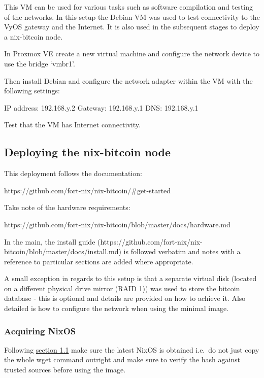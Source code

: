 This VM can be used for various tasks such as software compilation and
testing of the networks. In this setup the Debian VM was used to test
connectivity to the VyOS gateway and the Internet. It is also used in
the subsequent stages to deploy a nix-bitcoin node.

In Proxmox VE create a new virtual machine and configure the network
device to use the bridge `vmbr1'.

Then install Debian and configure the network adapter within the VM with
the following settings:

IP address: 192.168.y.2 Gateway: 192.168.y.1 DNS: 192.168.y.1

Test that the VM has Internet connectivity.

\hypertarget{deploying-the-nix-bitcoin-node}{%
\subsection{Deploying the nix-bitcoin
node}\label{deploying-the-nix-bitcoin-node}}

This deployment follows the documentation:

https://github.com/fort-nix/nix-bitcoin/\#get-started

Take note of the hardware requirements:

https://github.com/fort-nix/nix-bitcoin/blob/master/docs/hardware.md

In the main, the install guide
(https://github.com/fort-nix/nix-bitcoin/blob/master/docs/install.md) is
followed verbatim and notes with a reference to particular sections are
added where appropriate.

A small exception in regards to this setup is that a separate virtual
disk (located on a different physical drive mirror (RAID 1)) was used to
store the bitcoin database - this is optional and details are provided
on how to achieve it. Also detailed is how to configure the network when
using the minimal image.

\hypertarget{acquiring-nixos}{%
\subsubsection{Acquiring NixOS}\label{acquiring-nixos}}

Following
\href{https://github.com/fort-nix/nix-bitcoin/blob/master/docs/install.md\#1-nixos-installation}{section
1.1} make sure the latest NixOS is obtained i.e.~do not just copy the
whole wget command outright and make sure to verify the hash against
trusted sources before using the image.


